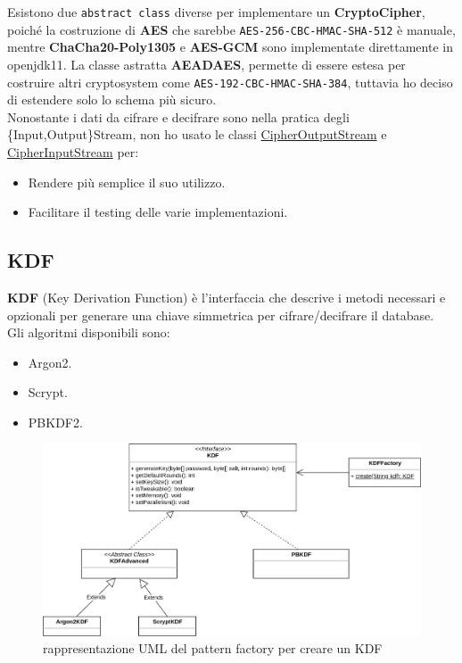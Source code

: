 \documentclass[a4paper,12pt]{report}
\begin{document}
Esistono due \texttt{abstract class} diverse per implementare un \textbf{CryptoCipher},
poiché la costruzione di \textbf{AES} che sarebbe \texttt{AES-256-CBC-HMAC-SHA-512} è manuale,
mentre \textbf{ChaCha20-Poly1305} e \textbf{AES-GCM} sono implementate direttamente in openjdk11.
La classe astratta \textbf{AEADAES}, permette di essere estesa per costruire altri
cryptosystem come \texttt{AES-192-CBC-HMAC-SHA-384}, tuttavia ho deciso di estendere
solo lo schema più sicuro.\\
Nonostante i dati da cifrare e decifrare sono nella pratica degli \{Input,Output\}Stream,
non ho usato le classi \href{https://docs.oracle.com/en/java/javase/11/docs/api/java.base/javax/crypto/CipherOutputStream.html}{CipherOutputStream}
e \href{https://docs.oracle.com/en/java/javase/11/docs/api/java.base/javax/crypto/CipherInputStream.html}{CipherInputStream}
per:
\begin{itemize}
  \item Rendere più semplice il suo utilizzo.
  \item Facilitare il testing delle varie implementazioni.
\end{itemize}


\subsection*{KDF}

\textbf{KDF} (Key Derivation Function) è l'interfaccia che descrive i metodi necessari
e opzionali per generare una chiave simmetrica per cifrare/decifrare il database.\\
Gli algoritmi disponibili sono:
\begin{itemize}
  \item Argon2.
  \item Scrypt.
  \item PBKDF2.
\end{itemize}

\begin{figure}[h]
\centering{}
\includegraphics[width=\textwidth]{kdf}
\caption{rappresentazione UML del pattern factory per creare un KDF}
\end{figure}
\end{document}
